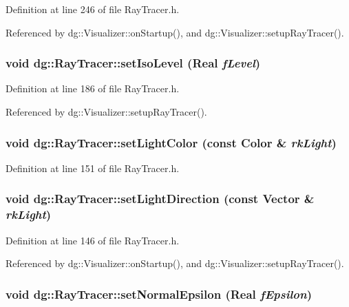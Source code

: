 Definition at line 246 of file Ray\-Tracer.h.

Referenced by dg::Visualizer::on\-Startup(), and dg::Visualizer::setup\-Ray\-Tracer().
\subsubsection{\setlength{\rightskip}{0pt plus 5cm}void dg::Ray\-Tracer::set\-Iso\-Level ({\bf Real} {\em f\-Level})\hspace{0.3cm}{\tt  [inline]}}\label{classdg_1_1RayTracer_a13}




Definition at line 186 of file Ray\-Tracer.h.

Referenced by dg::Visualizer::setup\-Ray\-Tracer().
\subsubsection{\setlength{\rightskip}{0pt plus 5cm}void dg::Ray\-Tracer::set\-Light\-Color (const {\bf Color} \& {\em rk\-Light})\hspace{0.3cm}{\tt  [inline]}}\label{classdg_1_1RayTracer_a8}




Definition at line 151 of file Ray\-Tracer.h.
\subsubsection{\setlength{\rightskip}{0pt plus 5cm}void dg::Ray\-Tracer::set\-Light\-Direction (const {\bf Vector} \& {\em rk\-Light})\hspace{0.3cm}{\tt  [inline]}}\label{classdg_1_1RayTracer_a6}




Definition at line 146 of file Ray\-Tracer.h.

Referenced by dg::Visualizer::on\-Startup(), and dg::Visualizer::setup\-Ray\-Tracer().
\subsubsection{\setlength{\rightskip}{0pt plus 5cm}void dg::Ray\-Tracer::set\-Normal\-Epsilon ({\bf Real} {\em f\-Epsilon})\hspace{0.3cm}{\tt  [inline]}}\label{classdg_1_1RayTracer_a9}




